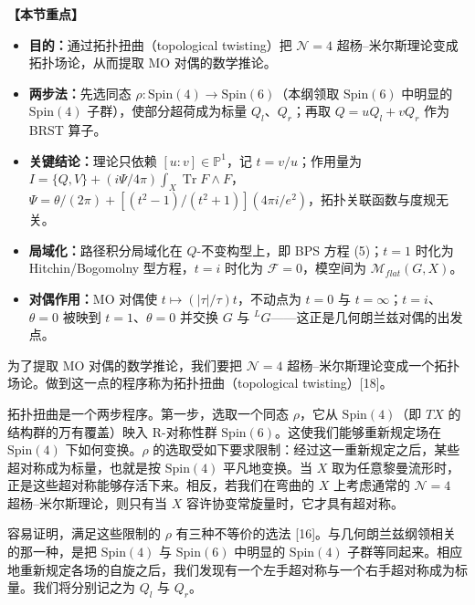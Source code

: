\documentclass[11pt,a4paper,UTF8]{ctexart}
\newenvironment{keypoints}{%
  \par\addvspace{0.9em}%
  \noindent{\color{black!80}\rule{\linewidth}{0.6pt}}\par\nopagebreak\vspace{2pt}%
  \noindent\textbf{【本节重点】}\par\nopagebreak\vspace{2pt}%
  \begin{itemize}[leftmargin=1.6em,itemsep=1pt,topsep=2pt,parsep=0pt]%
}{%
  \end{itemize}\vspace{1pt}\noindent{\color{black!80}\rule{\linewidth}{0.6pt}}\par\addvspace{0.9em}%
}
\begin{document}
\begin{keypoints}
    \item \textbf{目的：}通过拓扑扭曲（topological twisting）把 $\mathcal{N}=4$ 超杨–米尔斯理论变成拓扑场论，从而提取 MO 对偶的数学推论。
    \item \textbf{两步法：}先选同态 $\rho:\mathrm{Spin}(4)\to \mathrm{Spin}(6)$（本纲领取 $\mathrm{Spin}(6)$ 中明显的 $\mathrm{Spin}(4)$ 子群），使部分超荷成为标量 $Q_{l}$、$Q_{r}$；再取 $Q=uQ_{l}+vQ_{r}$ 作为 BRST 算子。
    \item \textbf{关键结论：}理论只依赖 $[u:v]\in\mathbb{P}^{1}$，记 $t=v/u$；作用量为 $I=\{Q,V\}+(i\Psi/4\pi)\int_{X}\operatorname{Tr}F\wedge F$，$\Psi=\theta/(2\pi)+[(t^{2}-1)/(t^{2}+1)](4\pi i/e^{2})$，拓扑关联函数与度规无关。
    \item \textbf{局域化：}路径积分局域化在 $Q$-不变构型上，即 BPS 方程 (5)；$t=1$ 时化为 Hitchin/Bogomolny 型方程，$t=i$ 时化为 $\mathcal{F}=0$，模空间为 $\mathcal{M}_{flat}(G,X)$。
    \item \textbf{对偶作用：}MO 对偶使 $t\mapsto(|\tau|/\tau)t$，不动点为 $t=0$ 与 $t=\infty$；$t=i$、$\theta=0$ 被映到 $t=1$、$\theta=0$ 并交换 $G$ 与 ${}^{L}G$——这正是几何朗兰兹对偶的出发点。
\end{keypoints}

为了提取 MO 对偶的数学推论，我们要把 $\mathcal{N}=4$ 超杨–米尔斯理论变成一个拓扑场论。做到这一点的程序称为拓扑扭曲（topological twisting）[18]。

拓扑扭曲是一个两步程序。第一步，选取一个同态 $\rho$，它从 $\mathrm{Spin}(4)$（即 $TX$ 的结构群的万有覆盖）映入 R-对称性群 $\mathrm{Spin}(6)$。这使我们能够重新规定场在 $\mathrm{Spin}(4)$ 下如何变换。$\rho$ 的选取受如下要求限制：经过这一重新规定之后，某些超对称成为标量，也就是按 $\mathrm{Spin}(4)$ 平凡地变换。当 $X$ 取为任意黎曼流形时，正是这些超对称能够存活下来。相反，若我们在弯曲的 $X$ 上考虑通常的 $\mathcal{N}=4$ 超杨–米尔斯理论，则只有当 $X$ 容许协变常旋量时，它才具有超对称。

容易证明，满足这些限制的 $\rho$ 有三种不等价的选法 [16]。与几何朗兰兹纲领相关的那一种，是把 $\mathrm{Spin}(4)$ 与 $\mathrm{Spin}(6)$ 中明显的 $\mathrm{Spin}(4)$ 子群等同起来。相应地重新规定各场的自旋之后，我们发现有一个左手超对称与一个右手超对称成为标量。我们将分别记之为 $Q_{l}$ 与 $Q_{r}$。
\end{document}

